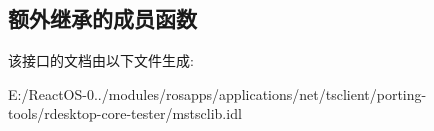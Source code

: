 \subsection*{额外继承的成员函数}


该接口的文档由以下文件生成\+:\begin{DoxyCompactItemize}
\item 
E\+:/\+React\+O\+S-\/0../modules/rosapps/applications/net/tsclient/porting-\/tools/rdesktop-\/core-\/tester/mstsclib.\+idl\end{DoxyCompactItemize}
